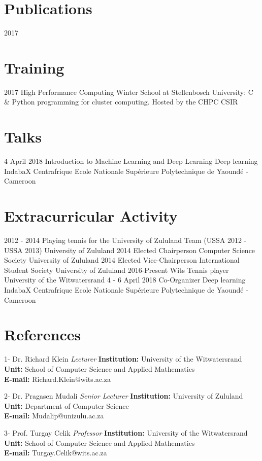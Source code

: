 \documentclass[letterpaper]{moderncv}        %
\begin{document}

	
\section{Publications}
\cventry
{2017}
{}
{}
{}
{\textit{}}
{}

\section{Training}
\cventry
{2017}
{High Performance Computing Winter School at Stellenbosch University: C \& Python programming for cluster computing.}
{Hosted by the CHPC}
{CSIR}
{\textit{}}
{}

\section{Talks}
\cventry
{4 April 2018}
{Introduction to Machine Learning and Deep Learning}
{Deep learning IndabaX Centrafrique}
{Ecole Nationale Supérieure Polytechnique de Yaoundé - Cameroon}
{\textit{}}
{}
	
\section{Extracurricular Activity}
\cventry
{2012 - 2014}
{Playing tennis for the University of Zululand Team (USSA 2012 - USSA 2013)}
{University of Zululand}
{}
{\textit{}}
{}
\cventry
{2014}
{Elected Chairperson Computer Science Society}
{University of Zululand}
{}
{\textit{}}
{}
\cventry
{2014}
{Elected Vice-Chairperson International Student Society}
{University of Zululand}
{}
{\textit{}}
{}	
\cventry
{2016-Present}
{Wits Tennis player}
{University of the Witwatersrand}
{}
{\textit{}}
{}
\cventry
{4 - 6 April 2018}
{Co-Organizer Deep learning IndabaX Centrafrique}
{Ecole Nationale Supérieure Polytechnique de Yaoundé - Cameroon}
{}
{\textit{}}
{}

\section{References}
\cventry
{1-}
{Dr. Richard Klein}
{}
{\textit{Lecturer}}
{}
{\textbf{Institution:} University of the Witwatersrand\\
	\textbf{Unit:} School of Computer Science and Applied Mathematics\\
	\textbf{E-mail:} Richard.Klein@wits.ac.za}
\vspace{1mm}

\cventry
{2-}
{Dr. Pragasen Mudali}
{}
{\textit{Senior Lecturer}}
{}
{\textbf{Institution:} University of Zululand\\
	\textbf{Unit:} Department of Computer Science\\
	\textbf{E-mail:} Mudalip@unizulu.ac.za}
\vspace{1mm}

\cventry
{3-}
{Prof. Turgay Celik}
{}
{\textit{Professor}}
{}
{\textbf{Institution:} University of the Witwatersrand\\
	\textbf{Unit:} School of Computer Science and Applied Mathematics\\
	\textbf{E-mail:} Turgay.Celik@wits.ac.za}
\vspace{1mm}
\end{document}
